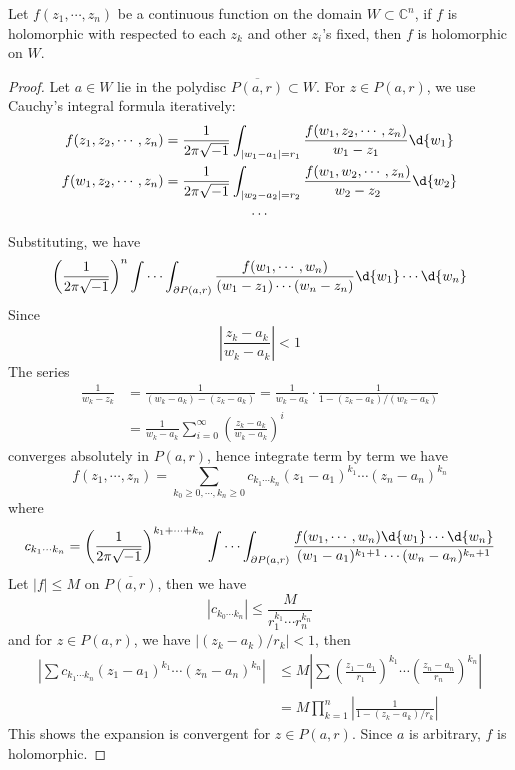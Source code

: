 \begin{thm}[Osgood]\label{osgood}
    Let $f(z_1,\cdots,z_n)$ be a continuous function on the domain $W\subset\mathbb{C}^n$, if $f$ is holomorphic with respected to each $z_k$ and other $z_i$'s fixed, then $f$ is holomorphic on $W$.
\end{thm}
\begin{proof}
    Let $a\in W$ lie in the polydisc $\overline{P(a,r)}\subset W$.
    For $z\in P(a,r)$, we use Cauchy's integral formula iteratively:
    \begin{gather*}
        f(z_1,z_2,\cdots,z_n)=\frac{1}{2\pi\sqrt{-1}}\int_{|w_1-a_1|=r_1}\frac{f(w_1,z_2,\cdots,z_n)}{w_1-z_1}\d{w_1}\\
        f(w_1,z_2,\cdots,z_n)=\frac{1}{2\pi\sqrt{-1}}\int_{|w_2-a_2|=r_2}\frac{f(w_1,w_2,\cdots,z_n)}{w_2-z_2}\d{w_2}\\
        \cdots
    \end{gather*}
    Substituting, we have
    \[\left(\frac{1}{2\pi\sqrt{-1}}\right)^n\idotsint_{\partial P(a,r)}\frac{f(w_1,\cdots,w_n)}{(w_1-z_1)\cdots(w_n-z_n)}\d{w_1}\cdots\d{w_n}\]
    Since
    \[\left|\frac{z_k-a_k}{w_k-a_k}\right|<1\]
    The series
    \begin{align*}
        \frac{1}{w_k-z_k}&=\frac{1}{(w_k-a_k)-(z_k-a_k)}=\frac{1}{w_k-a_k}\cdot\frac{1}{1-(z_k-a_k)/(w_k-a_k)}\\
        &=\frac{1}{w_k-a_k}\sum_{i=0}^\infty\left(\frac{z_k-a_k}{w_k-a_k}\right)^i
    \end{align*}
    converges absolutely in $P(a,r)$, hence integrate term by term we have
    \[f(z_1,\cdots,z_n)=\sum_{k_0\geq 0,\cdots,k_n\geq 0}c_{k_1\cdots k_n}(z_1-a_1)^{k_1}\cdots(z_n-a_n)^{k_n}\]
    where
    \[c_{k_1\cdots k_n}=\left(\frac{1}{2\pi\sqrt{-1}}\right)^{k_1+\cdots+k_n}\idotsint_{\partial P(a,r)}\frac{f(w_1,\cdots,w_n)\d{w_1}\cdots\d{w_n}}{(w_1-a_1)^{k_1+1}\cdots(w_n-a_n)^{k_n+1}}\]
    Let $|f|\leq M$ on $\overline{P(a,r)}$, then we have
    \[|c_{k_0\cdots k_n}|\leq\frac{M}{r_1^{k_1}\cdots r_n^{k_n}}\]
    and for $z\in P(a,r)$, we have $|(z_k-a_k)/r_k|<1$, then
    \begin{align*}
        \left|\sum c_{k_1\cdots k_n}(z_1-a_1)^{k_1}\cdots(z_n-a_n)^{k_n}\right|&\leq M\left|\sum\left(\frac{z_1-a_1}{r_1}\right)^{k_1}\cdots\left(\frac{z_n-a_n}{r_n}\right)^{k_n}\right|\\
        &=M\prod_{k=1}^n\left|\frac{1}{1-(z_k-a_k)/r_k}\right|
    \end{align*}
    This shows the expansion is convergent for $z\in P(a,r)$.
    Since $a$ is arbitrary, $f$ is holomorphic.
\end{proof}

